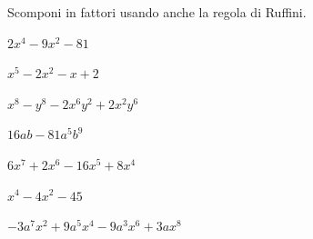 

\begin{esercizio}[*]
\label{ese:17.24}
Scomponi in fattori usando anche la regola di Ruffini.
\begin{enumeratea}
\item \(2x^{4}-9x^{2}-81\)
\item \(x^{5}-2x^{2}-x+2\)
\item \(x^{8}-y^{8}-2x^{6}y^{2}+2x^{2}y^{6}\)
\item \(16ab-81a^{5}b^{9}\)
\item \(6x^{7}+2x^{6}-16x^{5}+8x^{4}\)
\item \(x^{4}-4x^{2}-45\)
\item \(-3a^{7}x^{2}+9a^{5}x^{4}-9a^{3}x^{6}+3ax^{8}\)
\end{enumeratea}
\end{esercizio}

